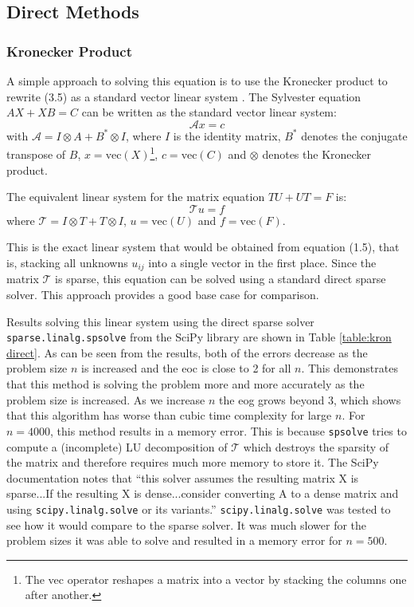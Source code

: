 \documentclass[11pt]{article}
\numberwithin{equation}{section}
\begin{document}
\subsection{Direct Methods}

\subsubsection{Kronecker Product}
A simple approach to solving this equation is to use the Kronecker product to rewrite (3.5) as a standard vector linear system \cite{Laub}. The Sylvester equation $AX + XB = C$ can be written as the standard vector linear system:
\begin{equation}
\mathcal{A}x = c
\end{equation}
with $\mathcal{A} = I \otimes A + B^* \otimes I$, where $I$ is the identity matrix, $B^*$ denotes the conjugate transpose of $B$, $x = \text{vec}(X)$\footnote{The vec operator reshapes a matrix into a vector by stacking the columns one after another.}, $c = \text{vec}(C)$ and $\otimes$ denotes the Kronecker product.

The equivalent linear system for the matrix equation $TU + UT = F$ is:
\begin{equation}
\mathcal{T}u = f
\end{equation}
where $\mathcal{T} = I \otimes T + T \otimes I$, $u = \text{vec}(U)$ and $f = \text{vec}(F)$.

This is the exact linear system that would be obtained from equation (1.5), that is, stacking all unknowns $u_{ij}$ into a single vector in the first place. Since the matrix $\mathcal{T}$ is sparse, this equation can be solved using a standard direct sparse solver. This approach provides a good base case for comparison. 

Results solving this linear system using the direct sparse solver \texttt{sparse.linalg.spsolve} from the SciPy library are shown in Table \ref{table:kron direct}. As can be seen from the results, both of the errors decrease as the problem size $n$ is increased and the eoc is close to 2 for all $n$. This demonstrates that this method is solving the problem more and more accurately as the problem size is increased. As we increase $n$ the eog grows beyond $3$, which shows that this algorithm has worse than cubic time complexity for large $n$. For $n=4000$, this method results in a memory error. This is because \texttt{spsolve} tries to compute a (incomplete) LU decomposition of $\mathcal{T}$ which destroys the sparsity of the matrix and therefore requires much more memory to store it. The SciPy documentation notes that ``this solver assumes the resulting matrix X is sparse...If the resulting X is dense...consider converting A to a dense matrix and using \texttt{scipy.linalg.solve} or its variants.'' \texttt{scipy.linalg.solve} was tested to see how it would compare to the sparse solver. It was much slower for the problem sizes it was able to solve and resulted in a memory error for $n=500$.
\end{document}
